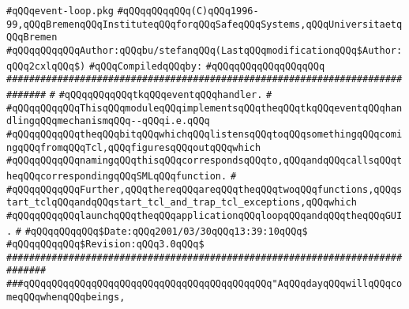 \label{src/lib/tk/src/event-loop.pkg}
\verb|#qQQqevent-loop.pkg|\newline
\verb|#qQQqqQQqqQQq(C)qQQq1996-99,qQQqBremenqQQqInstituteqQQqforqQQqSafeqQQqSystems,qQQqUniversitaetqQQqBremen|\newline
\verb|#qQQqqQQqqQQqAuthor:qQQqbu/stefanqQQq(LastqQQqmodificationqQQq$Author:qQQq2cxlqQQq$)|\newline
\newline
\verb|#qQQqCompiledqQQqby:|\newline
\verb|#qQQqqQQqqQQqqQQqqQQq|\newline
\newline
\verb|#############################################################################|\newline
\verb|#|\newline
\verb|#qQQqqQQqqQQqtkqQQqeventqQQqhandler.|\newline
\verb|#|\newline
\verb|#qQQqqQQqqQQqThisqQQqmoduleqQQqimplementsqQQqtheqQQqtkqQQqeventqQQqhandlingqQQqmechanismqQQq--qQQqi.e.qQQq|\newline
\verb|#qQQqqQQqqQQqtheqQQqbitqQQqwhichqQQqlistensqQQqtoqQQqsomethingqQQqcomingqQQqfromqQQqTcl,qQQqfiguresqQQqoutqQQqwhich|\newline
\verb|#qQQqqQQqqQQqnamingqQQqthisqQQqcorrespondsqQQqto,qQQqandqQQqcallsqQQqtheqQQqcorrespondingqQQqSMLqQQqfunction.|\newline
\verb|#|\newline
\verb|#qQQqqQQqqQQqFurther,qQQqthereqQQqareqQQqtheqQQqtwoqQQqfunctions,qQQqstart_tclqQQqandqQQqstart_tcl_and_trap_tcl_exceptions,qQQqwhich|\newline
\verb|#qQQqqQQqqQQqlaunchqQQqtheqQQqapplicationqQQqloopqQQqandqQQqtheqQQqGUI.|\newline
\verb|#|\newline
\verb|#qQQqqQQqqQQq$Date:qQQq2001/03/30qQQq13:39:10qQQq$|\newline
\verb|#qQQqqQQqqQQq$Revision:qQQq3.0qQQq$|\newline
\verb|#############################################################################|\newline
\newline
\newline
\newline
\verb|###qQQqqQQqqQQqqQQqqQQqqQQqqQQqqQQqqQQqqQQqqQQq"AqQQqdayqQQqwillqQQqcomeqQQqwhenqQQqbeings,|\newline
